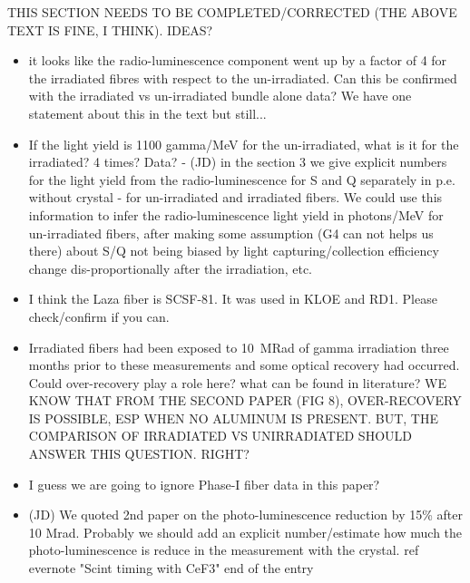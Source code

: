\documentclass[a4paper,11pt]{article}
\begin{document}
THIS SECTION NEEDS TO BE COMPLETED/CORRECTED (THE ABOVE TEXT IS FINE, I THINK).  IDEAS?

\begin{itemize}
    \item it looks like the radio-luminescence component went up by a factor of 4 for the irradiated fibres with respect to the un-irradiated.  Can this be confirmed with the irradiated vs un-irradiated bundle alone data?  We have one statement about this in the text but still...
    \item If the light yield is 1100 gamma/MeV for the un-irradiated, what is it for the irradiated?  4 times?  Data? - (JD) in the section 3 we give explicit numbers for the light yield from the radio-luminescence for S and Q separately in p.e. without crystal - for un-irradiated and irradiated fibers. We could use this information to infer the radio-luminescence light yield in photons/MeV for un-irradiated fibers, after making some assumption (G4 can not helps us there) about S/Q not being  biased by light capturing/collection efficiency change dis-proportionally after the irradiation, etc. 
    
    \item I think the Laza fiber is SCSF-81.  It was used in KLOE and RD1.  Please check/confirm if you can.
    \item Irradiated fibers had been exposed to 10~MRad of gamma irradiation three months prior to these measurements and some optical recovery had occurred. Could over-recovery play a role here? what can be found in literature?  WE KNOW THAT FROM THE SECOND PAPER (FIG 8), OVER-RECOVERY IS POSSIBLE, ESP WHEN NO ALUMINUM IS PRESENT.  BUT, THE COMPARISON OF IRRADIATED VS UNIRRADIATED SHOULD ANSWER THIS QUESTION.  RIGHT?
    \item I guess we are going to ignore Phase-I fiber data in this paper?
    \item (JD) We quoted 2nd paper on the photo-luminescence reduction by 15\% after 10 Mrad. Probably we should add an explicit number/estimate how much the photo-luminescence is reduce in the measurement with the crystal. ref evernote "Scint timing with CeF3" end of the entry 
\end{itemize}
\end{document}
